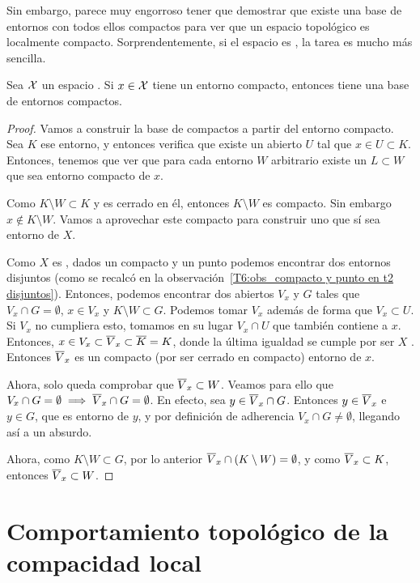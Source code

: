 Sin embargo, parece muy engorroso tener que demostrar que existe una base de entornos con todos ellos compactos para ver que un espacio topológico es localmente compacto. Sorprendentemente, si el espacio es \hausdorff, la tarea es mucho más sencilla.

\begin{prop}
	Sea $\mathcal{X}$ un espacio \hausdorff. Si $x\in \mathcal{X}$ tiene un entorno compacto, entonces tiene una base de entornos compactos.
	
	\begin{proof}
		Vamos a construir la base de compactos a partir del entorno compacto. Sea $K$ ese entorno, y entonces verifica que existe un abierto $U$ tal que $x\in U\subset K$. Entonces, tenemos que ver que para cada entorno $W$ arbitrario existe un $L\subset W$ que sea entorno compacto de $x$.
		
		Como $K\setminus W\subset K$ y es cerrado en él, entonces $K\setminus W$ es compacto. Sin embargo $x\notin K\setminus W$. Vamos a aprovechar este compacto para construir uno que sí sea entorno de $X$.
		
		Como $X$ es \hausdorff, dados un compacto y un punto podemos encontrar dos entornos disjuntos (como se recalcó en la observación~\ref{T6:obs_compacto y punto en t2 disjuntos}). Entonces, podemos encontrar dos abiertos $V_x$ y $G$ tales que $V_x\cap G=\emptyset$, $x\in V_x$ y $K\setminus W\subset G$. Podemos tomar $V_x$ además de forma que $V_x\subset U$. Si $V_x$ no cumpliera esto, tomamos en su lugar $V_x\cap U$ que también contiene a $x$. Entonces, $x\in V_x\subset \overline{V}_x\subset \overline{K}=K$, donde la última igualdad se cumple por ser $X$ \hausdorff. Entonces $\overline{V}_x$ es un compacto (por ser cerrado en compacto) entorno de $x$.
		
		Ahora, solo queda comprobar que $\overline{V}_x\subset W$. Veamos para ello que $V_x\cap G=\emptyset\implies \overline{V}_x\cap G=\emptyset$. En efecto, sea $y\in \overline{V}_x\cap G$. Entonces $y\in\overline{V}_x$ e $y\in G$, que es entorno de $y$, y por definición de adherencia $V_x \cap G\neq\emptyset$, llegando así a un absurdo.
	    
	    Ahora, como $K\setminus W\subset G$, por lo anterior $\overline{V}_x\cap (K\setminus W)=\emptyset$, y como $\overline{V}_x\subset K$, entonces $\overline{V}_x\subset W$.
	\end{proof}
\end{prop}

\section{Comportamiento topológico de la compacidad local}

